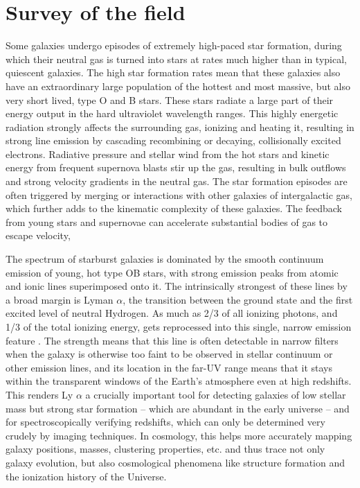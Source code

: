 \documentclass[12pt, a4paper]{scrartcl}
\begin{document}
\section{Survey of the field} 

Some galaxies undergo episodes of extremely high-paced
star formation, during which their neutral gas is turned into stars at
rates much higher than in typical, quiescent galaxies. The high star formation
rates mean that these galaxies also have an extraordinary large population of
the hottest and most massive, but also very short lived, type O and B stars.
These stars  radiate a large part of their energy output in the hard ultraviolet
wavelength ranges. This highly energetic radiation strongly affects the
surrounding gas, ionizing and heating it, resulting in strong line emission by 
cascading recombining or decaying, collisionally excited electrons. Radiative
pressure and stellar wind from the hot stars and kinetic energy from frequent
supernova blasts stir up the gas, resulting in bulk outflows and strong velocity
gradients in the neutral gas. The star formation episodes are often triggered by
merging or interactions with other galaxies of intergalactic gas, which further
adds to the kinematic complexity of these galaxies. The feedback from young
stars and supernovae can accelerate substantial bodies of gas to escape
velocity, 

The spectrum of starburst galaxies is dominated by the smooth continuum emission
of young, hot type OB stars, with strong emission peaks from atomic and ionic
lines superimposed onto it.  The intrinsically strongest of these lines by a
broad margin is Lyman $\alpha$, the transition between the ground state and the
first excited level of neutral Hydrogen. As much as 2/3 of all ionizing photons,
and 1/3 of the total ionizing energy, gets reprocessed into this single, narrow
emission feature \citep{DijkstraRev}. The strength means that this line is often
detectable in narrow filters when the galaxy is otherwise too faint to be
observed in stellar continuum or other emission lines, and its location in the
far-UV range means that it stays within the transparent windows of the Earth's
atmosphere even at high redshifts. This renders Ly $\alpha$ a crucially
important tool for detecting galaxies of low stellar mass but strong star
formation -- which are abundant in the early universe -- and for
spectroscopically verifying redshifts, which can only be determined very crudely
by imaging techniques.  In cosmology, this helps more accurately mapping galaxy
positions, masses, clustering properties, etc.  and thus trace not only galaxy
evolution, but also cosmological phenomena like structure formation and the
ionization history of the Universe.
\end{document}
